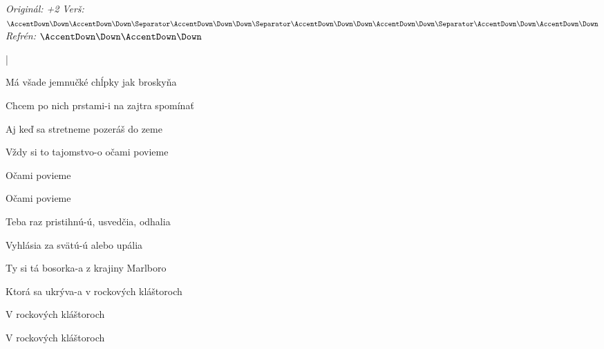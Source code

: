 \begin{song}


\begin{headerbox}
\RaiseBoxWithAccents
\textit{Originál: +2} \quad
\textit{Verš:} $\AccentDown\Down\AccentDown\Down \Separator \AccentDown\Down\Down \Separator \AccentDown\Down\Down\AccentDown\Down \Separator \AccentDown\Down\AccentDown\Down$ \quad
\textit{Refrén:} $\AccentDown\Down\AccentDown\Down$
\end{headerbox}

\begin{hchordbox}
\end{hchordbox}

\large

\bigskip

\Intro {}    |      \par

\bigskip

 Má všade jemnučké  chĺpky jak broskyňa \par
{} Chcem po nich prstami-i na zajtra spomínať \par
{} Aj keď sa stretneme  pozeráš do zeme \par
{} Vždy si to tajomstvo-o očami povieme \par
{}   Očami povieme \par
{}   Očami povieme \par

\bigskip

 Teba raz pristihnú-ú, usvedčia, odhalia \par
{} Vyhlásia za svätú-ú alebo upália \par
{} Ty si tá bosorka-a z krajiny Marlboro \par
{} Ktorá sa ukrýva-a v rockových kláštoroch \par
{}   V rockových kláštoroch \par
{}   V rockových kláštoroch \par


\end{song}
